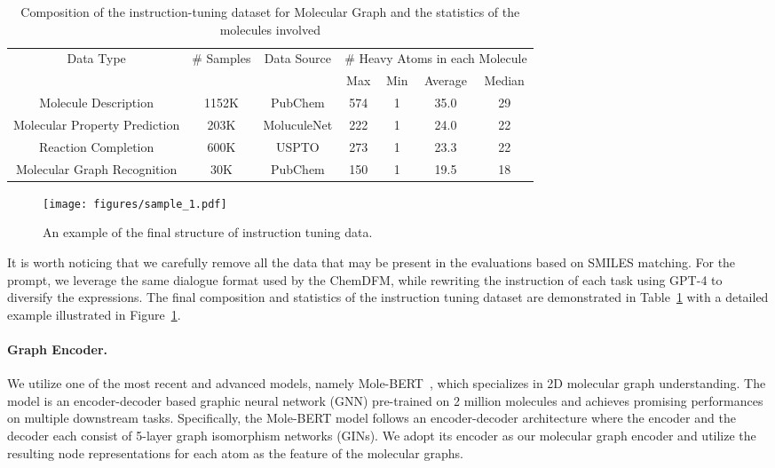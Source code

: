 \begin{table}
    \centering
    \begin{tabular}{ccccccc}
    \toprule
        \multirow{2}{*}{Data Type} & \multirow{2}{*}{\# Samples} & \multirow{2}{*}{Data Source} & \multicolumn{4}{c}{\# Heavy Atoms in each Molecule} \\
        & & & Max & Min & Average & Median \\
    \midrule
        Molecule Description & 1152K & PubChem & 574 & 1 & 35.0 & 29 \\
        Molecular Property Prediction & 203K & MoluculeNet & 222 & 1 & 24.0 & 22\\
        Reaction Completion & 600K & USPTO & 273 & 1 & 23.3 & 22 \\
        Molecular Graph Recognition & 30K & PubChem & 150 & 1 & 19.5 & 18\\
    \bottomrule
    \end{tabular}
    \caption{Composition of the instruction-tuning dataset for Molecular Graph and the statistics of the molecules involved}
    \label{tab:data2d}
\end{table}

\begin{figure}
    \centering
    \texttt{[image: figures/sample\_1.pdf]}
    \caption{An example of the final structure of instruction tuning data.}
    \label{figure:sample1}
\end{figure}

It is worth noticing that we carefully remove all the data that may be present in the evaluations based on SMILES matching. For the prompt, we leverage the same dialogue format used by the ChemDFM, while rewriting the instruction of each task using GPT-4 to diversify the expressions.
The final composition and statistics of the instruction tuning dataset are demonstrated in Table~\ref{tab:data2d} with a detailed example illustrated in Figure~\ref{figure:sample1}.

\paragraph{Graph Encoder.} We utilize one of the most recent and advanced models, namely Mole-BERT~\cite{xia2023molebert}, which specializes in 2D molecular graph understanding. The model is an encoder-decoder based graphic neural network (GNN) pre-trained on 2 million molecules
and achieves promising performances on multiple downstream tasks.
Specifically, the Mole-BERT model follows an encoder-decoder architecture where the encoder and the decoder each consist of 5-layer graph isomorphism networks (GINs). We adopt its encoder as our molecular graph encoder and utilize the resulting node representations for each atom as the feature of the molecular graphs.

